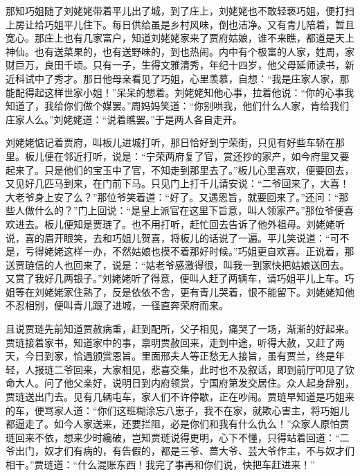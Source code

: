 \begin{parag}
    那知巧姐随了刘姥姥带着平儿出了城，到了庄上，刘姥姥也不敢轻亵巧姐，便打扫上房让给巧姐平儿住下。每日供给虽是乡村风味，倒也洁净。又有青儿陪着，暂且宽心。那庄上也有几家富户，知道刘姥姥家来了贾府姑娘，谁不来瞧，都道是天上神仙。也有送菜果的，也有送野味的，到也热闹。内中有个极富的人家，姓周，家财巨万，良田千顷。只有一子，生得文雅清秀，年纪十四岁，他父母延师读书，新近科试中了秀才。那日他母亲看见了巧姐，心里羡慕，自想：“我是庄家人家，那能配得起这样世家小姐！”呆呆的想着。刘姥姥知他心事，拉着他说：“你的心事我知道了，我给你们做个媒罢。”周妈妈笑道：“你别哄我，他们什么人家，肯给我们庄家人么。”刘姥姥道：“说着瞧罢。”于是两人各自走开。
\end{parag}


\begin{parag}
    刘姥姥惦记着贾府，叫板儿进城打听，那日恰好到宁荣街，只见有好些车轿在那里。板儿便在邻近打听，说是：“宁荣两府复了官，赏还抄的家产，如今府里又要起来了。只是他们的宝玉中了官，不知走到那里去了。”板儿心里喜欢，便要回去，又见好几匹马到来，在门前下马。只见门上打千儿请安说：“二爷回来了，大喜！大老爷身上安了么？”那位爷笑着道：“好了。又遇恩旨，就要回来了。”还问：“那些人做什么的？”门上回说：“是皇上派官在这里下旨意，叫人领家产。”那位爷便喜欢进去。板儿便知是贾琏了。也不用打听，赶忙回去告诉了他外祖母。刘姥姥听说，喜的眉开眼笑，去和巧姐儿贺喜，将板儿的话说了一遍。平儿笑说道：“可不是，亏得姥姥这样一办，不然姑娘也摸不着那好时候。”巧姐更自欢喜。正说着，那送贾琏信的人也回来了，说是：“姑老爷感激得很，叫我一到家快把姑娘送回去。又赏了我好几两银子。”刘姥姥听了得意，便叫人赶了两辆车，请巧姐平儿上车。巧姐等在刘姥姥家住熟了，反是依依不舍，更有青儿哭着，恨不能留下。刘姥姥知他不忍相别，便叫青儿跟了进城，一径直奔荣府而来。
\end{parag}


\begin{parag}
    且说贾琏先前知道贾赦病重，赶到配所，父子相见，痛哭了一场，渐渐的好起来。贾琏接着家书，知道家中的事，禀明贾赦回来，走到中途，听得大赦，又赶了两天，今日到家，恰遇颁赏恩旨。里面邢夫人等正愁无人接旨，虽有贾兰，终是年轻，人报琏二爷回来，大家相见，悲喜交集，此时也不及叙话，即到前厅叩见了钦命大人。问了他父亲好，说明日到内府领赏，宁国府第发交居住。众人起身辞别，贾琏送出门去。见有几辆屯车，家人们不许停歇，正在吵闹。贾琏早知道是巧姐来的车，便骂家人道：“你们这班糊涂忘八崽子，我不在家，就欺心害主，将巧姐儿都逼走了。如今人家送来，还要拦阻，必是你们和我有什么仇么！”众家人原怕贾琏回来不依，想来少时纔破，岂知贾琏说得更明，心下不懂，只得站着回道：“二爷出门，奴才们有病的，有告假的，都是三爷、蔷大爷、芸大爷作主，不与奴才们相干。”贾琏道：“什么混账东西！我完了事再和你们说，快把车赶进来！”
\end{parag}


